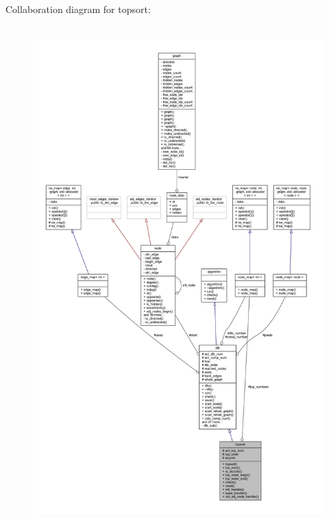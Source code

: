 Collaboration diagram for topsort\+:\nopagebreak
\begin{figure}[H]
\begin{center}
\leavevmode
\includegraphics[height=550pt]{classtopsort__coll__graph}
\end{center}
\end{figure}
